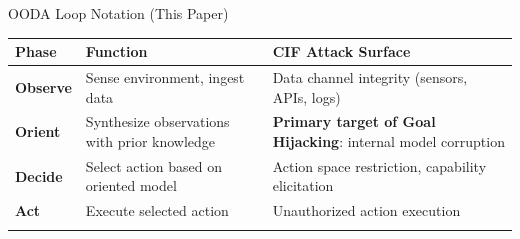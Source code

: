 \documentclass[
  ignorenonframetext,
]{beamer}
\newcounter{none} %
\begin{document}
\begin{frame}[allowframebreaks]{OODA Loop Notation (This Paper)}
\protect{}\label{ooda-loop-notation-this-paper}
{\def\LTcaptype{none} %
\begin{longtable}[]{@{}
  >{\raggedright\arraybackslash}p{}
  >{\raggedright\arraybackslash}p{}
  >{\raggedright\arraybackslash}p{}@{}}
\toprule\noalign{}
\begin{minipage}[b]{\linewidth}\raggedright
Phase
\end{minipage} & \begin{minipage}[b]{\linewidth}\raggedright
Function
\end{minipage} & \begin{minipage}[b]{\linewidth}\raggedright
CIF Attack Surface
\end{minipage} \\
\midrule\noalign{}
\endhead
\textbf{Observe} & Sense environment, ingest data & Data channel
integrity (sensors, APIs, logs) \\
\textbf{Orient} & Synthesize observations with prior knowledge &
\textbf{Primary target of Goal Hijacking}: internal model corruption \\
\textbf{Decide} & Select action based on oriented model & Action space
restriction, capability elicitation \\
\textbf{Act} & Execute selected action & Unauthorized action
execution \\
\bottomrule\noalign{}
\end{longtable}
}
\end{frame}
\end{document}
